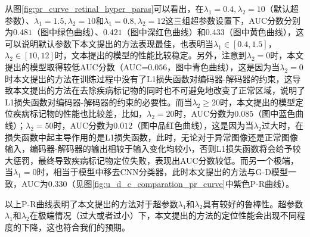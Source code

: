 从图\ref{fig:pr_curve_retinal_hyper_paras}可以看出，在$\lambda_{1}=0.4, \lambda_{2}=10$（默认超参数）、$\lambda_{1}=1.5,\lambda_{2}=10$和$\lambda_{1}=0.8,\lambda_{2}=12$这三组超参数设置下，AUC分数分别为$0.481$（图中绿色曲线）、$0.421$（图中深红色曲线）和$0.433$（图中黄色曲线），这可以说明默认参数下本文提出的方法表现最佳，也表明当$\lambda_{1}\in [0.4,1.5]$，$\lambda_{2}\in [10,12]$时，文本提出的模型的性能比较稳定。另外，注意到$\lambda_{2}=0$时，本文提出的模型取得较低AUC分数（AUC=$0.056$，图中青色曲线），这是因为当$\lambda_{2}=0$时本文提出的方法在训练过程中没有了L1损失函数对编码器-解码器的约束，这导致本文提出的方法在去除疾病标记物的同时也不可避免地改变了正常区域，说明了L1损失函数对编码器-解码器的约束的必要性。而当$\lambda_{2}\geq 20$时，本文提出的模型定位疾病标记物的性能也比较差，比如，$\lambda_{2}=20$时，AUC分数为$0.085$（图中蓝色曲线）；$\lambda_{2}=50$时，AUC分数为$0.012$（图中品红色曲线），这是因为当$\lambda_{2}$过大时，在损失函数中起主导作用的是L1损失函数，此时，无论对于异常图像还是正常图像输入，编码器-解码器的输出相较于输入变化均较小，否则L1损失函数将会给予较大惩罚，最终导致疾病标记物定位失败，表现出AUC分数较低。而另一个极端，当$\lambda_{1}=0$时，相当于模型中移去CNN分类器，此时本文提出的方法与G-D模型一致，AUC为$0.330$（见图\ref{fig:u_d_c_comparation_pr_curve}中紫色P-R曲线）。

以上P-R曲线表明了本文提出的方法对于超参数$\lambda_{1}$和$\lambda_{2}$具有较好的鲁棒性。超参数$\lambda_{1}$和$\lambda_{2}$在极端情况（过大或者过小）下，本文提出的方法的定位性能会出现不同程度的下降，这也符合我们的预期。
